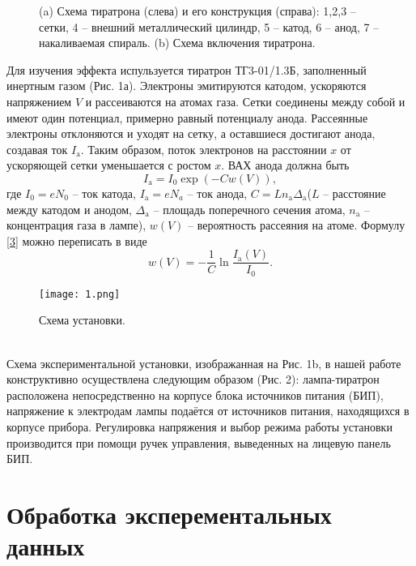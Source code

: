     \begin{figure}[h]
      \centering
      \caption{(a) Схема тиратрона (слева) и его конструкция (справа): 1,2,3 -- сетки, 4 -- внешний металлический цилиндр, 5 -- катод, 6 -- анод, 7 -- накаливаемая спираль. (b) Схема включения тиратрона.}
    \end{figure}
    Для изучения эффекта испульзуется тиратрон ТГ3-01/1.3Б, заполненный инертным газом (Рис. 1а). Электроны эмитируются катодом, ускоряются напряжением $V$ и рассеиваются на атомах газа. Сетки соединены между собой и имеют один потенциал, примерно равный потенциалу анода. Рассеянные электроны отклоняются и уходят на сетку, а оставшиеся достигают анода, создавая ток $I_\text{a}$. Таким образом, поток электронов на расстоянии $x$ от ускоряющей сетки уменьшается с ростом $x$. ВАХ анода должна быть
    \begin{equation}\label{3}
    I_\text{a} = I_0 \exp\left( - C w(V) \right),
    \end{equation}
    где $I_0 = eN_0$ -- ток катода, $I_\text{a} = eN_a$ -- ток анода, $C = Ln_\text{a} \Delta_\text{a}$($L$ --  расстояние между катодом и анодом, $\Delta_\text{a}$ -- площадь поперечного сечения атома, $n_\text{a}$ -- концентрация газа в лампе), $w(V)$ -- вероятность рассеяния на атоме.
    Формулу \eqref{3} можно переписать в виде
    \[\tag{5a}\label{5a}
    w(V) = -\dfrac{1}{C}\ln \dfrac{I_\text{a}(V)}{I_0}.
    \]
    \begin{figure}[h]
    \texttt{[image: 1.png]}
    \centering
    \caption{Схема установки.}
    \end{figure}\\
    Схема экспериментальной установки, изображанная на Рис. 1b, в нашей работе конструктивно осуществлена следующим образом (Рис. 2): лампа-тиратрон расположена непосредственно на корпусе блока источников питания (БИП), напряжение к электродам лампы подаётся от источников питания, находящихся в корпусе прибора. Регулировка напряжения и выбор режима работы установки производится при помощи ручек управления, выведенных на лицевую панель БИП.

    \section*{Обработка эксперементальных данных}

